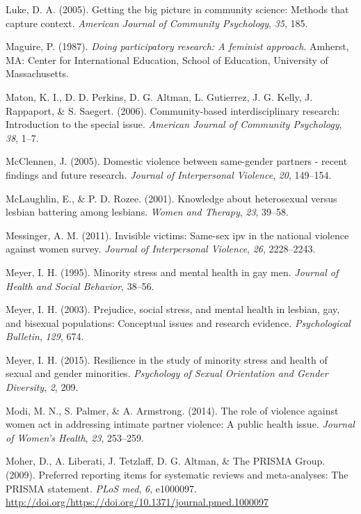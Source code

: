 \documentclass[11pt,]{tufte-book}
\begin{document}
\hypertarget{ref-luke2005getting}{}
Luke, D. A. (2005). Getting the big picture in community science:
Methods that capture context. \emph{American Journal of Community
Psychology}, \emph{35}, 185.

\hypertarget{ref-maguire1987doing}{}
Maguire, P. (1987). \emph{Doing participatory research: A feminist
approach}. Amherst, MA: Center for International Education, School of
Education, University of Massachusetts.

\hypertarget{ref-maton2006community}{}
Maton, K. I., D. D. Perkins, D. G. Altman, L. Gutierrez, J. G. Kelly, J.
Rappaport, \& S. Saegert. (2006). Community-based interdisciplinary
research: Introduction to the special issue. \emph{American Journal of
Community Psychology}, \emph{38}, 1--7.

\hypertarget{ref-mcclennen2005domestic}{}
McClennen, J. (2005). Domestic violence between same-gender partners -
recent findings and future research. \emph{Journal of Interpersonal
Violence}, \emph{20}, 149--154.

\hypertarget{ref-mclaughlin2001knowledge}{}
McLaughlin, E., \& P. D. Rozee. (2001). Knowledge about heterosexual
versus lesbian battering among lesbians. \emph{Women and Therapy},
\emph{23}, 39--58.

\hypertarget{ref-messinger2011invisible}{}
Messinger, A. M. (2011). Invisible victims: Same-sex ipv in the national
violence against women survey. \emph{Journal of Interpersonal Violence},
\emph{26}, 2228--2243.

\hypertarget{ref-meyer1995minority}{}
Meyer, I. H. (1995). Minority stress and mental health in gay men.
\emph{Journal of Health and Social Behavior}, 38--56.

\hypertarget{ref-meyer2003prejudice}{}
Meyer, I. H. (2003). Prejudice, social stress, and mental health in
lesbian, gay, and bisexual populations: Conceptual issues and research
evidence. \emph{Psychological Bulletin}, \emph{129}, 674.

\hypertarget{ref-meyer2015resilience}{}
Meyer, I. H. (2015). Resilience in the study of minority stress and
health of sexual and gender minorities. \emph{Psychology of Sexual
Orientation and Gender Diversity}, \emph{2}, 209.

\hypertarget{ref-modi2014role}{}
Modi, M. N., S. Palmer, \& A. Armstrong. (2014). The role of violence
against women act in addressing intimate partner violence: A public
health issue. \emph{Journal of Women's Health}, \emph{23}, 253--259.

\hypertarget{ref-moher2009preferred}{}
Moher, D., A. Liberati, J. Tetzlaff, D. G. Altman, \& The PRISMA Group.
(2009). Preferred reporting items for systematic reviews and
meta-analyses: The PRISMA statement. \emph{PLoS med}, \emph{6},
e1000097.
\url{http://doi.org/https://doi.org/10.1371/journal.pmed.1000097}
\end{document}
